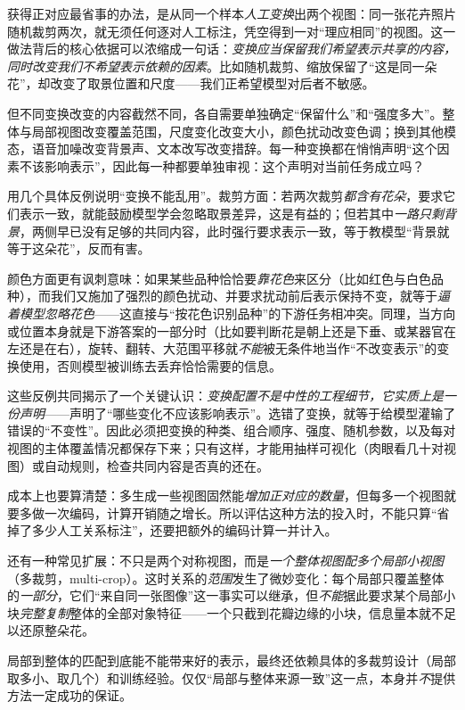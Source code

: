 获得正对应最省事的办法，是从同一个样本\emph{人工变换}出两个视图：同一张花卉照片随机裁剪两次，就无须任何逐对人工标注，凭空得到一对“理应相同”的视图。这一做法背后的核心依据可以浓缩成一句话：\emph{变换应当保留我们希望表示共享的内容，同时改变我们不希望表示依赖的因素}。比如随机裁剪、缩放保留了“这是同一朵花”，却改变了取景位置和尺度——我们正希望模型对后者不敏感。

但不同变换改变的内容截然不同，各自需要单独确定“保留什么”和“强度多大”。整体与局部视图改变覆盖范围，尺度变化改变大小，颜色扰动改变色调；换到其他模态，语音加噪改变背景声、文本改写改变措辞。每一种变换都在悄悄声明“这个因素不该影响表示”，因此每一种都要单独审视：这个声明对当前任务成立吗？

用几个具体反例说明“变换不能乱用”。裁剪方面：若两次裁剪\emph{都含有花朵}，要求它们表示一致，就能鼓励模型学会忽略取景差异，这是有益的；但若其中\emph{一路只剩背景}，两侧早已没有足够的共同内容，此时强行要求表示一致，等于教模型“背景就等于这朵花”，反而有害。

颜色方面更有讽刺意味：如果某些品种恰恰要\emph{靠花色}来区分（比如红色与白色品种），而我们又施加了强烈的颜色扰动、并要求扰动前后表示保持不变，就等于\emph{逼着模型忽略花色}——这直接与“按花色识别品种”的下游任务相冲突。同理，当方向或位置本身就是下游答案的一部分时（比如要判断花是朝上还是下垂、或某器官在左还是在右），旋转、翻转、大范围平移就\emph{不能}被无条件地当作“不改变表示”的变换使用，否则模型被训练去丢弃恰恰需要的信息。

这些反例共同揭示了一个关键认识：\emph{变换配置不是中性的工程细节，它实质上是一份声明}——声明了“哪些变化不应该影响表示”。选错了变换，就等于给模型灌输了错误的“不变性”。因此必须把变换的种类、组合顺序、强度、随机参数，以及每对视图的主体覆盖情况都保存下来；只有这样，才能用抽样可视化（肉眼看几十对视图）或自动规则，检查共同内容是否真的还在。

成本上也要算清楚：多生成一些视图固然能\emph{增加正对应的数量}，但每多一个视图就要多做一次编码，计算开销随之增长。所以评估这种方法的投入时，不能只算“省掉了多少人工关系标注”，还要把额外的编码计算一并计入。

还有一种常见扩展：不只是两个对称视图，而是\emph{一个整体视图配多个局部小视图}（多裁剪，multi-crop）。这时关系的\emph{范围}发生了微妙变化：每个局部只覆盖整体的\emph{一部分}，它们“来自同一张图像”这一事实可以继承，但\emph{不能}据此要求某个局部小块\emph{完整复制}整体的全部对象特征——一个只截到花瓣边缘的小块，信息量本就不足以还原整朵花。

局部到整体的匹配到底能不能带来好的表示，最终还依赖具体的多裁剪设计（局部取多小、取几个）和训练经验。仅仅“局部与整体来源一致”这一点，本身并\emph{不}提供方法一定成功的保证。

